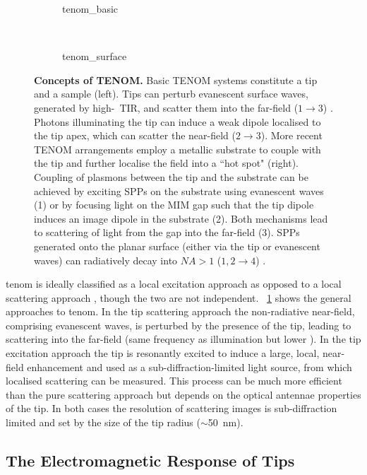 \documentclass{article}
\begin{document}
\begin{figure}[bt]
\flushleft
\begin{subfigure}[t]{0.47\textwidth}
	{tenom_basic}
\end{subfigure}
~
\begin{subfigure}[t]{0.49\textwidth}
	{tenom_surface}
\end{subfigure}
\caption[Concepts of TENOM]{\textbf{Concepts of TENOM.} Basic TENOM systems constitute a tip and a sample (left). Tips can perturb evanescent surface waves, generated by high-\NA\ TIR, and scatter them into the far-field ($1\rightarrow3$) \cite{neacsu2005, mehtani2006}. Photons illuminating the tip can induce a weak dipole localised to the tip apex, which can scatter the near-field ($2\rightarrow3$). More recent TENOM arrangements employ a metallic substrate to couple with the tip and further localise the field into a ``hot spot" (right). Coupling of plasmons between the tip and the substrate can be achieved by exciting SPPs on the substrate using evanescent waves (1) or by focusing light on the MIM gap such that the tip dipole induces an image dipole in the substrate (2). Both mechanisms lead to scattering of light from the gap into the far-field (3). SPPs generated onto the planar surface (either via the tip or evanescent waves) can radiatively decay into $\mathit{NA}>1$ ($1,2\rightarrow4$) \cite{wang2011}.}
\label{fig:tenom_concept}
\end{figure}

\Gls{tenom} is ideally classified as a local excitation approach as opposed to a local scattering approach \cite{novotny2006}, though the two are not independent. \figurename~\ref{fig:tenom_concept} shows the general approaches to \gls{tenom}. In the tip scattering approach the non-radiative near-field, comprising evanescent waves, is perturbed by the presence of the tip, leading to scattering into the far-field {\color{red}(same frequency as illumination but lower \wvm)}. In the tip excitation approach the tip is resonantly excited to induce a large, local, near-field enhancement and used as a sub-diffraction-limited light source, from which  localised scattering can be measured. This process can be much more efficient than the pure scattering approach but depends on the optical antennae properties of the tip. In both cases the resolution of scattering images is sub-diffraction limited and set by the size of the tip radius ($\sim$\SI{50}{nm}).

\subsection{The Electromagnetic Response of Tips}
\end{document}
